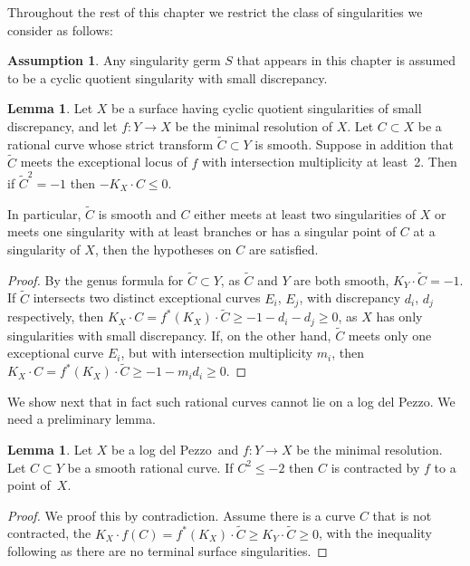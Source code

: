 \documentclass[11pt]{amsbook}
\theoremstyle{definition}
\theoremstyle{definition}
\theoremstyle{definition}
\theoremstyle{definition}
\theoremstyle{definition}
\newtheorem{lem}[thm]{Lemma}
\theoremstyle{definition}
\theoremstyle{definition}
\theoremstyle{definition}
\newtheorem{assumption}[thm]{Assumption}
\newcommand{\ldp}{log del Pezzo}
\newcommand{\minres}{minimal resolution}
\newcommand{\wt}[1]{\widetilde #1}
\begin{document}
Throughout the rest of this chapter we restrict the class of singularities we consider as follows:

\begin{assumption}
Any singularity germ $S$ that appears in this chapter is assumed to be a cyclic
quotient singularity with small discrepancy.
\end{assumption}

\begin{lem}\label{lem!badcurve}
Let $X$ be a surface having cyclic quotient singularities of small discrepancy, and let  $f \colon Y \rightarrow X$ be the minimal resolution of $X$. Let $C \subset X$ be a rational curve whose 
strict transform $\widetilde C \subset Y$ is smooth. Suppose in addition that 
$\widetilde C$ meets the exceptional locus of $f$ with intersection multiplicity at least~2.
Then if $\widetilde C^2 = -1$ then $-K_X \cdot C \leq 0$.

In particular, $\widetilde C$ is smooth and
$C$ either meets at least two singularities of $X$ or meets one singularity
with at least branches or has a singular point of $C$ at a singularity of $X$,
then the hypotheses on $C$ are satisfied.
\end{lem}
\begin{proof}
By the genus formula for $\widetilde C\subset Y$, as $\widetilde C$ and $Y$ are both smooth,
$K_Y \cdot \widetilde C = -1$. If $\wt C$ intersects two distinct exceptional curves $E_i$, $E_j$,
with discrepancy $d_i$, $d_j$ respectively, then
 $K_X \cdot C = f^*(K_X) \cdot \widetilde C \geq -1 - d_i - d_j  \geq 0$,
 as $X$ has only singularities with small discrepancy. 
 If, on the other hand, $\wt C$ meets only one exceptional curve $E_i$, but with intersection
multiplicity $m_i$, then $K_X \cdot C = f^*(K_X) \cdot \widetilde C \geq -1 - m_id_i  \geq 0$.
\end{proof}

We show next that in fact such rational curves cannot lie on a \ldp.
We need a preliminary lemma.
\begin{lem}\label{lem!minus2curve}
Let $X$ be a \ldp\ and $f \colon Y \rightarrow X$ be the \minres.
Let $C\subset Y$ be a smooth rational curve. If $C^2\le-2$ then $C$ is contracted by $f$
to a point of~$X$.
\end{lem}

\begin{proof}
We proof this by contradiction. Assume there is a curve $C$ that is not contracted, the $K_X \cdot f(C) = f^*(K_X) \cdot \wt{C} \geq K_Y \cdot \wt{C} \geq 0$, with the inequality following as there are no terminal surface singularities.
\end{proof}
\end{document}
